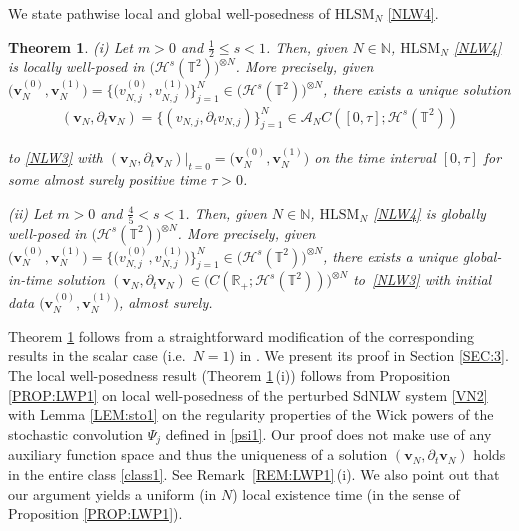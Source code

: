 \documentclass[letterpaper, 11pt,  reqno]{amsart}
\newtheorem{theorem}{Theorem}[section]
\newcommand{\1}{\hspace{0.5mm}\text{I}\hspace{0.2mm}}
\newcommand{\noi}{\noindent}
\newcommand{\R}{\mathbb{R}}
\newcommand{\T}{\mathbb{T}}
\newcommand{\N}{\mathbb{N}}
\renewcommand{\H}{\mathcal{H}}
\newcommand{\dt}{\partial_t}
\newcommand{\A}{\mathcal{A}}
\newcommand{\HLS}{$\text{HLSM}_N$ }
\newcommand{\HLSS}{$\text{HLSM}_N$}
\newcommand{\vv}{\mathbf{v}}
\numberwithin{equation}{section}
\numberwithin{theorem}{section}
\begin{document}
We  state pathwise local and global well-posedness of \HLS \eqref{NLW4}.

\begin{theorem} %
\label{THM:GWP1}
\textup{(i)}
Let $m > 0$ and $\frac 12 \le s < 1$.
Then, given $N \in \N$, \HLS \eqref{NLW4} is locally well-posed
in $\big(\H^s (\T^2)\big)^{\otimes N}$.
More precisely, 
given $\big(\vv_N^{(0)}, \vv_N^{(1)}\big)  = \big\{\big(v^{(0)}_{N, j}, v^{(1)}_{N, j}\big) \big\}_{j = 1}^N \in 
\big(\H^s (\T^2)\big)^{\otimes N}$, 
there exists 
a unique solution 
\begin{align}
 (\vv_N, \dt \vv_N) 
 = \{(v_{N, j}, \dt v_{N, j})\}_{j = 1}^N
  \in \A_N C([0, \tau];  \H^s(\T^2))
\label{class1}
\end{align}

\noi
  to \eqref{NLW3}
with $(\vv_N, \dt \vv_N)|_{t = 0}
= \big(\vv_N^{(0)}, \vv_N^{(1)}\big)$
on the time interval $[0, \tau]$
for some almost surely positive time $\tau  > 0$.



\medskip

\noi
\textup{(ii)}
Let $m > 0$ and $ \frac 45 < s < 1$.
Then, given $N \in \N$, \HLS \eqref{NLW4} is globally well-posed
in $\big(\H^s (\T^2)\big)^{\otimes N}$.
More precisely, 
given  $\big(\vv_{N}^{(0)},  \vv_{N}^{(1)}\big) = \big\{\big(v_{N, j}^{(0)},  v_{N, j}^{(1)}\big)\big\}_{j = 1}^N \in \big(\H^s (\T^2)\big)^{\otimes N}$, 
 there exists a unique global-in-time solution 
$(\vv_N, \dt \vv_N) \in \big(  C (\R_+; \H^s (\T^2) )\big)^{\otimes N}$
 to~\eqref{NLW3} with initial data
$\big(\vv_{N}^{(0)},  \vv_{N}^{(1)}\big)$, 
almost surely.

\end{theorem}





Theorem \ref{THM:GWP1}
follows from a straightforward modification
of the corresponding results in the scalar case (i.e.~$N = 1$)
in \cite{GKOT}.
We present its proof in Section \ref{SEC:3}.
The local well-posedness result 
(Theorem \ref{THM:GWP1}\,(i))
follows from Proposition \ref{PROP:LWP1}
on local well-posedness of the perturbed SdNLW system \eqref{VN2}
with 
 Lemma \ref{LEM:sto1}
on the regularity properties
of the Wick powers of the stochastic convolution $\Psi_j$
defined in \eqref{psi1}.
Our proof does not make use of any auxiliary function space
and thus the uniqueness of a solution 
$ (\vv_N, \dt \vv_N) $
holds in the entire class \eqref{class1}.
See Remark~\ref{REM:LWP1}\,(i).
We also point out that our argument yields
a uniform (in $N$)
local existence time (in the sense of Proposition \ref{PROP:LWP1}).
\end{document}
